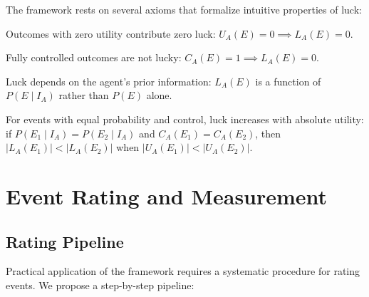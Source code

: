 The framework rests on several axioms that formalize intuitive
properties of luck:

\begin{assumption}
  [Neutrality] Outcomes with zero utility contribute zero luck:
  $U_{A}(E) = 0 \implies L_{A}(E) = 0$.
\end{assumption}

\begin{assumption}
   Fully controlled outcomes are not lucky:
  $C_{A}(E) = 1 \implies L_{A}(E) = 0$.
\end{assumption}

\begin{assumption}
   Luck depends on the agent's prior information:
  $L_{A}(E)$ is a function of $P(E \mid I_{A})$ rather than $P(E)$ alone.
\end{assumption}

\begin{assumption}
   For events with equal probability and control,
  luck increases with absolute utility: if $P(E_{1}\mid I_{A}) = P(E_{2}\mid
  I_{A})$ and $C_{A}(E_{1}) = C_{A}(E_{2})$, then
  $|L_{A}(E_{1})| < |L_{A}(E_{2})|$ when
  $|U_{A}(E_{1})| < |U_{A}(E_{2})|$.
\end{assumption}

\section{Event Rating and Measurement}
\label{sec:rating}

\subsection{Rating Pipeline}

Practical application of the framework requires a systematic procedure
for rating events. We propose a step-by-step pipeline:

